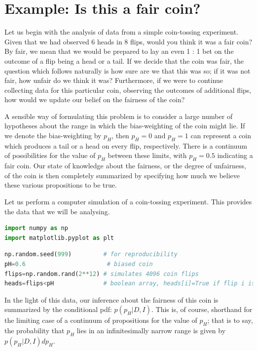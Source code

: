 \documentclass[%
oneside,                 %
final,                   %
10pt]{article}
\begin{document}
\section{Example: Is this a fair coin?}
Let us begin with the analysis of data from a simple coin-tossing experiment. 
Given that we had observed 6 heads in 8 flips, would you think it was a fair coin? By fair, we mean that we would be prepared to lay an even 1 : 1 bet on the outcome of a flip being a head or a tail. If we decide that the coin was fair, the question which follows naturally is how sure are we that this was so; if it was not fair, how unfair do we think it was? Furthermore, if we were to continue collecting data for this particular coin, observing the outcomes of additional flips, how would we update our belief on the fairness of the coin?

A sensible way of formulating this problem is to consider a large number of hypotheses about the range in which the bias-weighting of the coin might lie. If we denote the bias-weighting by $p_H$, then $p_H = 0$ and $p_H = 1$ can represent a coin which produces a tail or a head on every flip, respectively. There is a continuum of possibilities for the value of $p_H$ between these limits, with $p_H = 0.5$ indicating a fair coin. Our state of knowledge about the fairness, or the degree of unfairness, of the coin is then completely summarized by specifying how much we believe these various propositions to be true. 

Let us perform a computer simulation of a coin-tossing experiment. This provides the data that we will be analysing.

\begin{lstlisting}[language=Python,style=blue1]
import numpy as np
import matplotlib.pyplot as plt
\end{lstlisting}

\begin{lstlisting}[language=Python,style=blue1]
np.random.seed(999)         # for reproducibility
pH=0.6                       # biased coin
flips=np.random.rand(2**12) # simulates 4096 coin flips
heads=flips<pH              # boolean array, heads[i]=True if flip i is heads
\end{lstlisting}

In the light of this data, our inference about the fairness of this coin is summarized by the conditional pdf: $p(p_H|D,I)$. This is, of course, shorthand for the limiting case of a continuum of propositions for the value of $p_H$; that is to say, the probability that $p_H$ lies in an infinitesimally narrow range is given by $p(p_H|D,I) dp_H$. 
\end{document}
